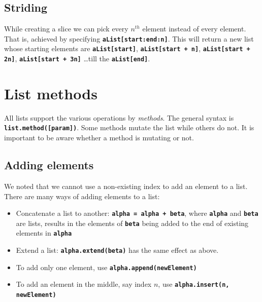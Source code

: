 \documentclass[11pt,a4paper]{article}
\newcommand{\Code}[1]{\textbf{\texttt{#1}}}
\begin{document}
\subsection*{Striding}
 
While creating a slice we can pick every $n^{th}$ element instead of every element. That is, achieved by specifying \Code{aList[start:end:n]}. This will return a new list whose starting elements are \Code{aList[start]}, \Code{aList[start + n]}, \Code{aList[start + 2n]}, \Code{aList[start + 3n]} \ldots till the \Code{aList[end]}. 

\section*{List methods}
All lists support the various operations by \emph{methods}. The general syntax is \Code{list.method([param])}. Some methods mutate the list while others do not. It is important to be aware whether a method is mutating or not.
\subsection*{Adding elements}
We noted that we cannot use a non-existing index to add an element to a list. There are many ways of adding elements to a list:
    \begin{itemize}
        \item Concatenate a list to another: \Code{alpha = alpha + beta}, where \Code{alpha} and \Code{beta} are lists, results in the elements of \Code{beta} being added to the end of existing elements in \Code{alpha}
        \item Extend a list: \Code{alpha.extend(beta)} has the same effect as above.
        \item To add only one element, use \Code{alpha.append(newElement)}
        \item To add an element in the middle, say index $n$, use \Code{alpha.insert(n, newElement)}
    \end{itemize}
\end{document}
